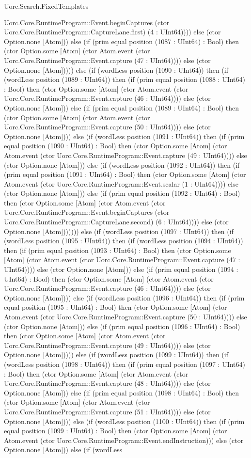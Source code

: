 \begin{lexlean}{Uorc.Search.FixedTemplates}
\begin{semanticmodule}
{Uorc.Core.RuntimeProgram::Event.beginCaptures (ctor Uorc.Core.RuntimeProgram::CaptureLane.first) (4 : UInt64)))) else (ctor Option.none [Atom])) else (if (prim equal position (1087 : UInt64) : Bool) then (ctor Option.some [Atom] (ctor Atom.event (ctor Uorc.Core.RuntimeProgram::Event.capture (47 : UInt64)))) else (ctor Option.none [Atom])))) else (if (wordLess position (1090 : UInt64)) then (if (wordLess position (1089 : UInt64)) then (if (prim equal position (1088 : UInt64) : Bool) then (ctor Option.some [Atom] (ctor Atom.event (ctor Uorc.Core.RuntimeProgram::Event.capture (46 : UInt64)))) else (ctor Option.none [Atom])) else (if (prim equal position (1089 : UInt64) : Bool) then (ctor Option.some [Atom] (ctor Atom.event (ctor Uorc.Core.RuntimeProgram::Event.capture (50 : UInt64)))) else (ctor Option.none [Atom]))) else (if (wordLess position (1091 : UInt64)) then (if (prim equal position (1090 : UInt64) : Bool) then (ctor Option.some [Atom] (ctor Atom.event (ctor Uorc.Core.RuntimeProgram::Event.capture (49 : UInt64)))) else (ctor Option.none [Atom])) else (if (wordLess position (1092 : UInt64)) then (if (prim equal position (1091 : UInt64) : Bool) then (ctor Option.some [Atom] (ctor Atom.event (ctor Uorc.Core.RuntimeProgram::Event.scalar (1 : UInt64)))) else (ctor Option.none [Atom])) else (if (prim equal position (1092 : UInt64) : Bool) then (ctor Option.some [Atom] (ctor Atom.event (ctor Uorc.Core.RuntimeProgram::Event.beginCaptures (ctor Uorc.Core.RuntimeProgram::CaptureLane.second) (6 : UInt64)))) else (ctor Option.none [Atom])))))) else (if (wordLess position (1097 : UInt64)) then (if (wordLess position (1095 : UInt64)) then (if (wordLess position (1094 : UInt64)) then (if (prim equal position (1093 : UInt64) : Bool) then (ctor Option.some [Atom] (ctor Atom.event (ctor Uorc.Core.RuntimeProgram::Event.capture (47 : UInt64)))) else (ctor Option.none [Atom])) else (if (prim equal position (1094 : UInt64) : Bool) then (ctor Option.some [Atom] (ctor Atom.event (ctor Uorc.Core.RuntimeProgram::Event.capture (46 : UInt64)))) else (ctor Option.none [Atom]))) else (if (wordLess position (1096 : UInt64)) then (if (prim equal position (1095 : UInt64) : Bool) then (ctor Option.some [Atom] (ctor Atom.event (ctor Uorc.Core.RuntimeProgram::Event.capture (50 : UInt64)))) else (ctor Option.none [Atom])) else (if (prim equal position (1096 : UInt64) : Bool) then (ctor Option.some [Atom] (ctor Atom.event (ctor Uorc.Core.RuntimeProgram::Event.capture (49 : UInt64)))) else (ctor Option.none [Atom])))) else (if (wordLess position (1099 : UInt64)) then (if (wordLess position (1098 : UInt64)) then (if (prim equal position (1097 : UInt64) : Bool) then (ctor Option.some [Atom] (ctor Atom.event (ctor Uorc.Core.RuntimeProgram::Event.capture (48 : UInt64)))) else (ctor Option.none [Atom])) else (if (prim equal position (1098 : UInt64) : Bool) then (ctor Option.some [Atom] (ctor Atom.event (ctor Uorc.Core.RuntimeProgram::Event.capture (51 : UInt64)))) else (ctor Option.none [Atom]))) else (if (wordLess position (1100 : UInt64)) then (if (prim equal position (1099 : UInt64) : Bool) then (ctor Option.some [Atom] (ctor Atom.event (ctor Uorc.Core.RuntimeProgram::Event.endInstruction))) else (ctor Option.none [Atom])) else (if (wordLess }
\end{semanticmodule}
\end{lexlean}
